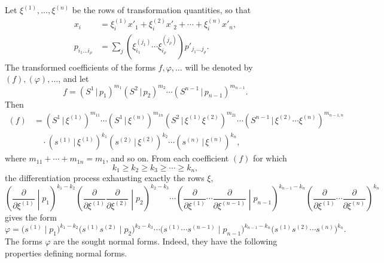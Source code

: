 \documentclass[11pt]{article}
\providecommand{\pair}[2]{(#1\,|\,#2)}
\begin{document}
Let $\xi^{(1)},\ldots,\xi^{(n)}$ be the rows of transformation quantities, so that
\begin{equation}
\begin{aligned}
x_i&=\xi_i^{(1)}x'_1+\xi_i^{(2)}x'_2+\cdots+\xi_i^{(n)}x'_n,\\
p_{i_1\ldots i_\rho}&=\sum_j(\xi_{i_1}^{(j_1)}\cdots \xi_{i_\rho}^{(j_\rho)})p'_{j_1\ldots j_\rho}.
\end{aligned}
\tag{47}
\end{equation}
The transformed coefficients of the forms $f,\varphi,\ldots$ will be denoted by $(f),(\varphi),\ldots$, and let
\[
 f=\pair{S^1}{p_1}^{m_1}\pair{S^2}{p_2}^{m_2}\cdots\pair{S^{n-1}}{p_{n-1}}^{m_{n-1}}.
\]
Then
\begin{equation}
\begin{aligned}
(f)&=\pair{S^1}{\xi^{(1)}}^{m_{11}}\cdots\pair{S^1}{\xi^{(n)}}^{m_{1n}}
\pair{S^2}{\xi^{(1)}\xi^{(2)}}^{m_{21}}\cdots
\pair{S^{n-1}}{\xi^{(2)}\cdots\xi^{(n)}}^{m_{n-1,n}}\\
&\quad\cdot\pair{s^{(1)}}{\xi^{(1)}}^{k_1}\pair{s^{(2)}}{\xi^{(2)}}^{k_2}\cdots\pair{s^{(n)}}{\xi^{(n)}}^{k_n},
\end{aligned}
\tag{48}
\end{equation}
where $m_{11}+\cdots+m_{1n}=m_1$, and so on. From each coefficient $(f)$ for which
\begin{equation}
 k_1\ge k_2\ge k_3\ge\cdots\ge k_n,
\tag{49}
\end{equation}
the differentiation process exhausting exactly the rows $\xi$,
\begin{equation}
\left(\frac{\partial}{\partial\xi^{(1)}}\middle|p_1\right)^{k_1-k_2}
\left(\frac{\partial}{\partial\xi^{(1)}}\frac{\partial}{\partial\xi^{(2)}}\middle|p_2\right)^{k_2-k_3}
\cdots
\left(\frac{\partial}{\partial\xi^{(1)}}\cdots\frac{\partial}{\partial\xi^{(n-1)}}\middle|p_{n-1}\right)^{k_{n-1}-k_n}
\left(\frac{\partial}{\partial\xi^{(1)}}\cdots\frac{\partial}{\partial\xi^{(n)}}\right)^{k_n}
\tag{50}
\end{equation}
gives the form
\begin{equation}
 \varphi=\bigl(s^{(1)}\mid p_1\bigr)^{k_1-k_2}
 \bigl(s^{(1)}s^{(2)}\mid p_2\bigr)^{k_2-k_3}\cdots
 \bigl(s^{(1)}\cdots s^{(n-1)}\mid p_{n-1}\bigr)^{k_{n-1}-k_n}
 \bigl(s^{(1)}s^{(2)}\cdots s^{(n)}\bigr)^{k_n}.
\tag{51}
\end{equation}
The forms $\varphi$ are the sought normal forms. Indeed, they have the following properties defining normal forms.
\end{document}
